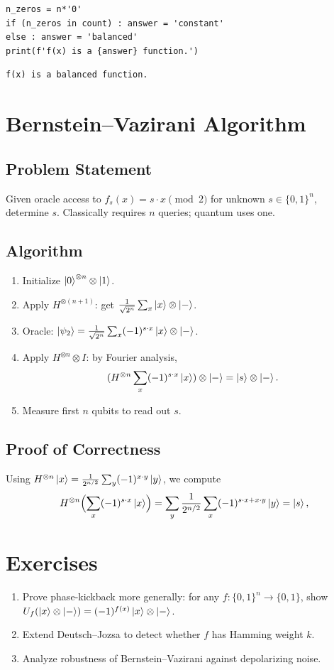 \begin{lstlisting}[style=python]
n_zeros = n*'0'
if (n_zeros in count) : answer = 'constant'
else : answer = 'balanced'
print(f'f(x) is a {answer} function.')
\end{lstlisting}
\begin{lstlisting}
f(x) is a balanced function.
\end{lstlisting}


\newpage
\section{Bernstein--Vazirani Algorithm}
\label{sec:BernsteinVazirani}
\subsection{Problem Statement}
Given oracle access to $f_s(x)=s\cdot x\pmod2$ for unknown $s\in\{0,1\}^n$, determine $s$.  Classically requires $n$ queries; quantum uses one.

\subsection{Algorithm}
\begin{enumerate}
	\item Initialize $\ket{0}^{\otimes n}\otimes\ket1$.
	\item Apply $H^{\otimes(n+1)}$: get $\tfrac1{\sqrt{2^n}}\sum_x\ket{x}\otimes\ket{-}$.
	\item Oracle: $\ket{\psi_2}=\tfrac1{\sqrt{2^n}}\sum_x(-1)^{s\cdot x}\ket{x}\otimes\ket{-}$.
	\item Apply $H^{\otimes n}\otimes I$: by Fourier analysis,
	\[
	(H^{\otimes n}\sum_x(-1)^{s\cdot x}\ket{x})\otimes\ket{-}
	=\ket{s}\otimes\ket{-}.
	\]
	\item Measure first $n$ qubits to read out $s$.
\end{enumerate}

\subsection{Proof of Correctness}
Using $H^{\otimes n}\ket{x}=\tfrac1{2^{n/2}}\sum_y(-1)^{x\cdot y}\ket{y}$, we compute
\[
H^{\otimes n}\Bigl(\sum_x(-1)^{s\cdot x}\ket{x}\Bigr)
=\sum_y\frac1{2^{n/2}}\sum_x(-1)^{s\cdot x + x\cdot y}\ket{y}
=\ket{s},
\]

\section*{Exercises}
\begin{enumerate}
	\item Prove phase‐kickback more generally: for any $f:\{0,1\}^n\to\{0,1\}$,
	show $U_f(\ket{x}\otimes\ket{-})=(-1)^{f(x)}\ket{x}\otimes\ket{-}$.
	\item Extend Deutsch--Jozsa to detect whether $f$ has Hamming weight $k$.
	\item Analyze robustness of Bernstein--Vazirani against depolarizing noise.
\end{enumerate}

